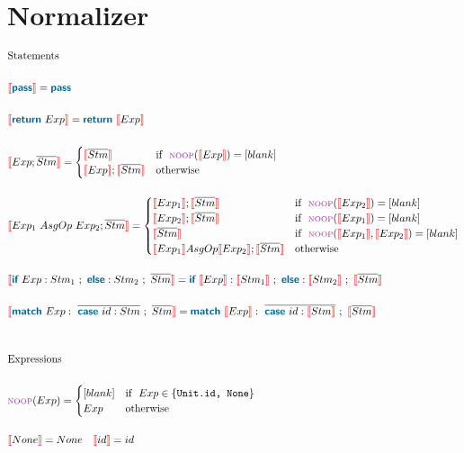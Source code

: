 \documentclass{thesis}
\newcommand{\mblue}[1]{\textbf{\textsf{\color{MidnightBlue}#1}}}
\newcommand{\nl}[1]{{\color{red}{\llbracket}}#1{\color{red}{\rrbracket}}} %
\begin{document}
\section{Normalizer}
\begin{align*}
  & \text{Statements}\\
  \\
  & \nl{\mblue{pass}} = \mblue{pass}\\
  \\
  & \nl{\mblue{return}~Exp} = \mblue{return} ~ \nl{Exp}\\
  \\
  & \nl{Exp;\overline{Stm}} =
  \begin{cases}
    \nl{\overline{Stm}} & \text{if}~~ {\scriptsize{\text{\color{Purple}NOOP}}}(\nl{Exp}) = [blank]\\
    \nl{Exp} ; \nl{\overline{Stm}} & \text{otherwise}
  \end{cases}\\
  \\
  & \nl{Exp_1 ~AsgOp~ Exp_2 ; \overline{Stm}} = 
  \begin{cases}
    \nl{Exp_1} ; \nl{\overline{Stm}} & \text{if}~~ {\scriptsize{\text{\color{Purple}NOOP}}}(\nl{Exp_2}) = [blank]\\
    \nl{Exp_2} ; \nl{\overline{Stm}} & \text{if}~~ {\scriptsize{\text{\color{Purple}NOOP}}}(\nl{Exp_1}) = [blank]\\
    \nl{\overline{Stm}} & \text{if}~~ {\scriptsize{\text{\color{Purple}NOOP}}}(\nl{Exp_1},\nl{Exp_2}) = [blank]\\
    \nl{Exp_1} AsgOp \nl{Exp_2} ; \nl{\overline{Stm}} & \text{otherwise}
  \end{cases}\\
  \\
  & \nl{\mblue{if}~Exp:Stm_1~;~\mblue{else}:Stm_2 ~;~\overline{Stm}} = \mblue{if}~\nl{Exp}:\nl{Stm_1}~;~\mblue{else}:\nl{Stm_2}~;~\nl{\overline{Stm}}\\
  \\
  & \nl{\mblue{match}~Exp:~\overline{\mblue{case}~id:Stm}~;~\overline{Stm}} = \mblue{match}~\nl{Exp}:~\overline{\mblue{case}~id:\nl{Stm}}~;~\nl{\overline{Stm}}
  \\
  \\
  \\
  & \text{Expressions}\\
  \\
  & {\scriptsize{\text{\color{Purple}NOOP}}}(Exp) = 
  \begin{cases}
    [blank] & \text{if}~~ Exp \in \{\texttt{Unit.id, None}\}\\
    Exp & \text{otherwise}
  \end{cases}\\
  \\
  & \nl{None} = None ~~~ \nl{id} = id
\end{align*}
\end{document}
